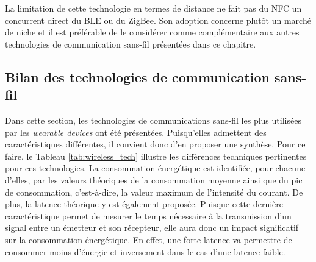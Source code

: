 La limitation de cette technologie en termes de distance ne fait pas du \acs{NFC} un concurrent direct du \acs{BLE} ou du ZigBee. Son adoption concerne plutôt un marché de niche et il est préférable de le considérer comme complémentaire aux autres technologies de communication sans-fil présentées dans ce chapitre.

\subsection{Bilan des technologies de communication sans-fil}

Dans cette section, les technologies de communications sans-fil les plus utilisées par les \textit{wearable devices} ont été présentées. Puisqu'elles admettent des caractéristiques différentes, il convient donc d'en proposer une synthèse. Pour ce faire, le Tableau \ref{tab:wireless_tech} illustre les différences techniques pertinentes pour ces technologies. La consommation énergétique est identifiée, pour chacune d'elles, par les valeurs théoriques de la consommation moyenne ainsi que du pic de consommation, c'est-à-dire, la valeur maximum de l'intensité du courant. De plus, la latence théorique y est également proposée. Puisque cette dernière caractéristique permet de mesurer le temps nécessaire à la transmission d'un signal entre un émetteur et son récepteur, elle aura donc un impact significatif sur la consommation énergétique. En effet, une forte latence va permettre de consommer moins d'énergie et inversement dans le cas d'une latence faible.

